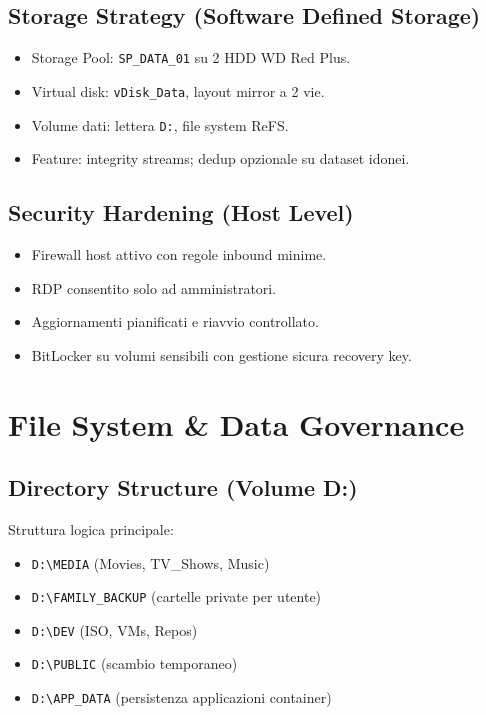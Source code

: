 \documentclass[11pt,a4paper]{article}
\begin{document}
\subsection{Storage Strategy (Software Defined Storage)}
\begin{itemize}
  \item Storage Pool: \texttt{SP\_DATA\_01} su 2 HDD WD Red Plus.
  \item Virtual disk: \texttt{vDisk\_Data}, layout mirror a 2 vie.
  \item Volume dati: lettera \texttt{D:}, file system ReFS.
  \item Feature: integrity streams; dedup opzionale su dataset idonei.
\end{itemize}

\subsection{Security Hardening (Host Level)}
\begin{itemize}
  \item Firewall host attivo con regole inbound minime.
  \item RDP consentito solo ad amministratori.
  \item Aggiornamenti pianificati e riavvio controllato.
  \item BitLocker su volumi sensibili con gestione sicura recovery key.
\end{itemize}

\section{File System \& Data Governance}

\subsection{Directory Structure (Volume D:)}
Struttura logica principale:
\begin{itemize}
  \item \texttt{D:\textbackslash{}MEDIA} (Movies, TV\_Shows, Music)
  \item \texttt{D:\textbackslash{}FAMILY\_BACKUP} (cartelle private per utente)
  \item \texttt{D:\textbackslash{}DEV} (ISO, VMs, Repos)
  \item \texttt{D:\textbackslash{}PUBLIC} (scambio temporaneo)
  \item \texttt{D:\textbackslash{}APP\_DATA} (persistenza applicazioni container)
\end{itemize}
\end{document}
